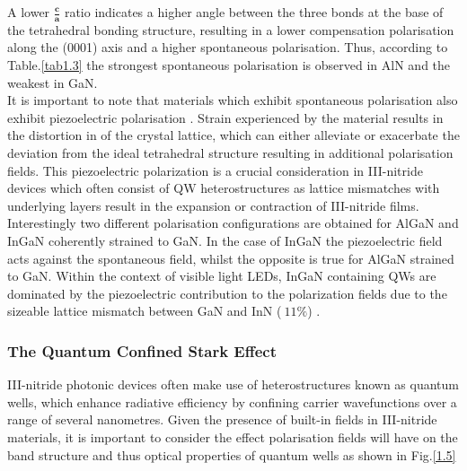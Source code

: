 A lower $\mathbf{\frac{c}{a}}$ ratio indicates a higher angle between the three bonds at the base of the tetrahedral bonding structure, resulting in a lower compensation polarisation along the (0001) axis and a higher spontaneous polarisation. Thus, according to Table.\ref{tab1.3} the strongest spontaneous polarisation is observed in AlN and the weakest in GaN.\\
It is important to note that materials which exhibit spontaneous polarisation also exhibit piezoelectric polarisation \cite{Ambacher2002}. Strain experienced by the material results in the distortion in of the crystal lattice, which can either alleviate or exacerbate the deviation from the ideal tetrahedral structure resulting in additional polarisation fields. This piezoelectric polarization is a crucial consideration in III-nitride devices which often consist of QW heterostructures as lattice mismatches with underlying layers result in the expansion or contraction of III-nitride films. Interestingly two different polarisation configurations are obtained for AlGaN and InGaN coherently strained to GaN. In the case of InGaN the piezoelectric field acts against the spontaneous field, whilst the opposite is true for AlGaN strained to GaN. Within the context of visible light LEDs, InGaN containing QWs are dominated by the piezoelectric contribution to the polarization fields \cite{Fiorentini1999} due to the sizeable lattice mismatch between GaN and InN ($~11\%$) \cite{Chichibu2006}.

\subsubsection{The Quantum Confined Stark Effect}

III-nitride photonic devices often make use of heterostructures known as quantum wells, which enhance radiative efficiency by confining carrier wavefunctions over a range of several nanometres. Given the presence of built-in fields in III-nitride materials, it is important to consider the effect polarisation fields will have on the band structure and thus optical properties of quantum wells as shown in Fig.\ref{1.5}

